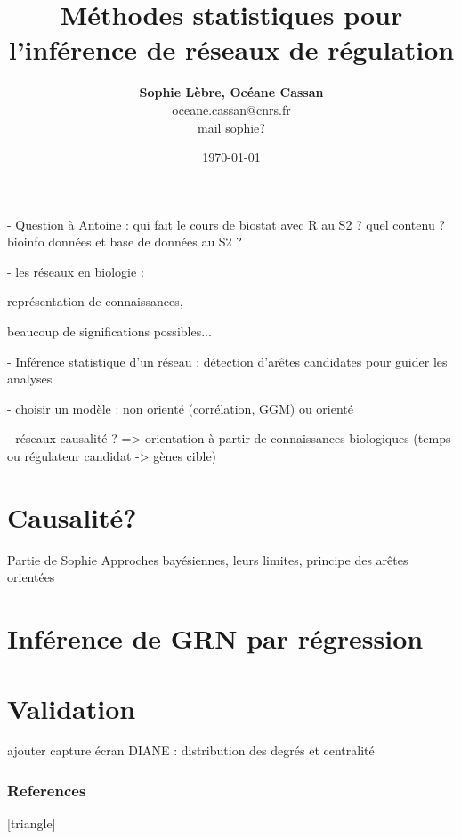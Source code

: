 \documentclass[xcolor=dvipsnames]{beamer}
\title[L'inférence statistique de GRN]{Méthodes statistiques pour l'inférence de réseaux de régulation}
\date{\today}
\author[Sophie Lèbre, Océane Cassan]
{\textbf{Sophie Lèbre, Océane Cassan} \\ oceane.cassan@cnrs.fr \\ mail sophie?}
\institute[]{
BFP M1, Parcours Bipa}
\begin{document}
	
	\begin{frame}
		\titlepage
	\end{frame}
	
	\begin{frame}
		\tableofcontents
	\end{frame}

	\begin{frame}
	
- Question à Antoine : qui fait le cours de biostat avec R au S2 ? quel contenu ?
	bioinfo données et base de données au S2 ? 
	
- les réseaux en biologie : 

représentation de connaissances, 

beaucoup de significations possibles...

- Inférence statistique d'un réseau : détection d'arêtes candidates pour guider les analyses

- choisir un modèle : non orienté (corrélation, GGM) ou orienté 

- réseaux causalité ? => orientation à partir de connaissances biologiques (temps ou régulateur candidat  -> gènes cible)
	\end{frame}	
	

    
    
\section{Causalité?}
\begin{frame}{Partie de Sophie}
    Approches bayésiennes, leurs limites, principe des arêtes orientées
\end{frame}


    	

    	
\section{Inférence de GRN par régression}


    
	
	
	
	
	\section{Validation}
	
	
	
	
		\begin{frame}
ajouter capture écran DIANE : distribution des degrés et centralité
	\end{frame}
	
	


\begin{frame}[allowframebreaks]
    \frametitle{References}
    [triangle]
    \scriptsize
    
    
\end{frame}
\end{document}
